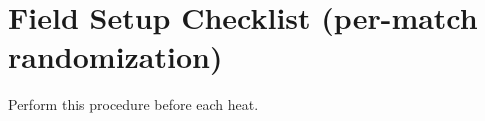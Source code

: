 \documentclass[a4]{article}
\begin{document}

\pagebreak
\section*{Field Setup Checklist (per-match randomization)}

Perform this procedure before each heat.

\end{document}
